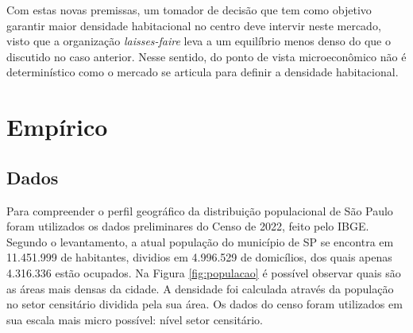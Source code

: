 
Com estas novas premissas, um tomador de decisão que tem como objetivo garantir maior densidade habitacional no centro deve intervir neste mercado, visto que a organização \textit{laisses-faire} leva a um equilíbrio menos denso do que o discutido no caso anterior. Nesse sentido, do ponto de vista microeconômico não é determinístico como o mercado se articula para definir a densidade habitacional.


\chapter{Empírico}
\label{sec:emp}

\section{Dados}

Para compreender o perfil geográfico da distribuição populacional de São Paulo foram utilizados os dados preliminares do Censo de 2022, feito pelo IBGE. Segundo o levantamento, a atual população do município de SP se encontra em 11.451.999 de habitantes, dividios em 4.996.529 de domicílios, dos quais apenas 4.316.336 estão ocupados. Na Figura \ref{fig:populacao} é possível observar quais são as áreas mais densas da cidade. A densidade foi calculada através da população no setor censitário dividida pela sua área. Os dados do censo foram utilizados em sua escala mais micro possível: nível setor censitário.


